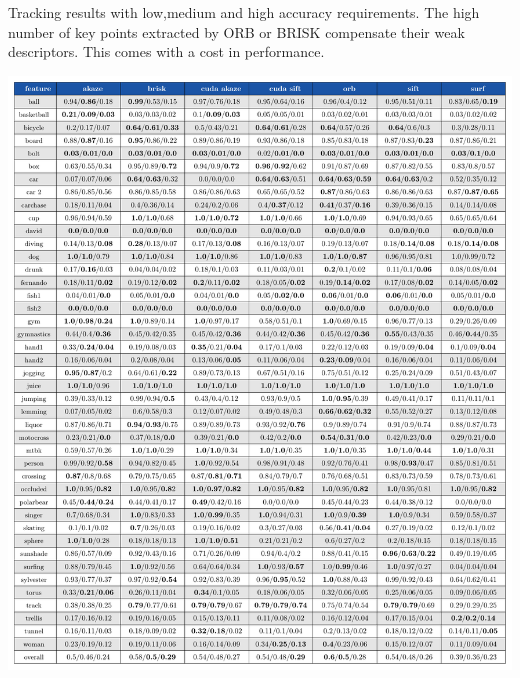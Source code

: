 \begin{table}[h]
\caption{Tracking results with low,medium and high accuracy requirements. The high number of key points extracted by ORB or BRISK compensate their weak descriptors. This comes with a cost in performance.} 
\centerline{%
		\includegraphics[width=0.98\linewidth]{tables/tracking_precision.pdf}}
    \vspace{-2mm} 
	\label{table:taccuracy}
\end{table}